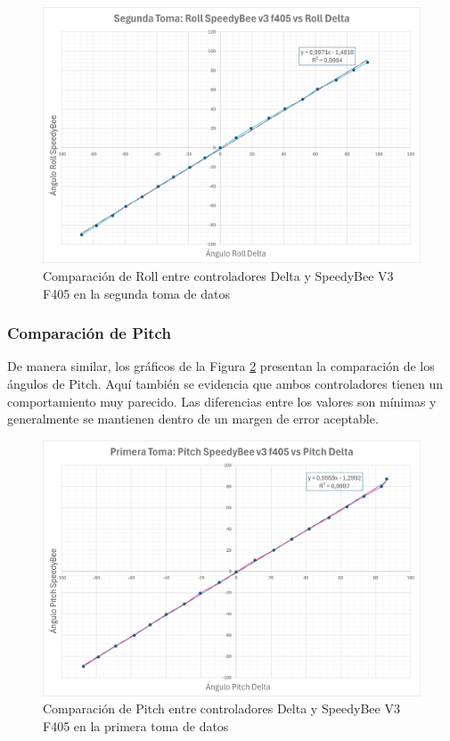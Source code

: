 \begin{figure}[H]
    \centering
    \includegraphics[width=5.5 in]{Imagenes/Pruebas/roll_2_compare.png}
    \caption{Comparación de Roll entre controladores Delta y SpeedyBee V3 F405 en la segunda toma de datos }
    \label{fig:comparacionRoll}
\end{figure}


\subsubsection{Comparación de Pitch}
De manera similar, los gráficos de la Figura \ref{fig:comparacionPitch1} presentan la comparación de los ángulos de Pitch. Aquí también se evidencia que ambos controladores tienen un comportamiento muy parecido. Las diferencias entre los valores son mínimas y generalmente se mantienen dentro de un margen de error aceptable.


\begin{figure}[H]
    \centering
    \includegraphics[width=5.5 in]{Imagenes/Pruebas/pitch_1_compare.png}
    \caption{Comparación de Pitch entre controladores Delta y SpeedyBee V3 F405 en la primera toma de datos }
    \label{fig:comparacionPitch1}
\end{figure}

